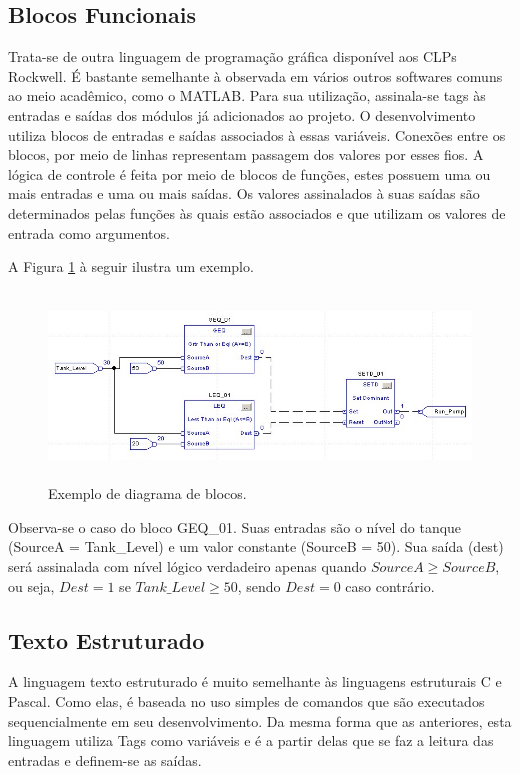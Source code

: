 \subsection{Blocos Funcionais} \label{subsec:blocos}
Trata-se de outra linguagem de programação gráfica disponível aos CLPs Rockwell. É bastante semelhante à observada em vários outros softwares comuns ao meio acadêmico, como o MATLAB. Para sua utilização, assinala-se tags às entradas e saídas dos módulos já adicionados ao projeto. O desenvolvimento utiliza blocos de entradas e saídas associados à essas variáveis. Conexões entre os blocos, por meio de linhas representam passagem dos valores por esses fios. A lógica de controle é feita por meio de blocos de funções, estes possuem uma ou mais entradas e uma ou mais saídas. Os valores assinalados à suas saídas são determinados pelas funções às quais estão associados e que utilizam os valores de entrada como argumentos.

A Figura \ref{fig:blocos} à seguir ilustra um exemplo.

\begin{figure}[H]
	\centering
	\includegraphics[height=5cm,keepaspectratio]{figs/blocos.png}
	\caption{Exemplo de diagrama de blocos.}
	\label{fig:blocos}
\end{figure}

Observa-se o caso do bloco GEQ\_01. Suas entradas são o nível do tanque (SourceA = Tank\_Level) e um valor constante (SourceB = 50). Sua saída (dest) será assinalada com nível lógico verdadeiro apenas quando $SourceA \geq SourceB$, ou seja, $Dest=1$ se $Tank\_Level \geq 50$, sendo $Dest = 0$ caso contrário.

\subsection{Texto Estruturado} \label{secTexEst} 
A linguagem texto estruturado é muito semelhante às linguagens estruturais C e Pascal. Como elas, é baseada no uso simples de comandos que são executados sequencialmente em seu desenvolvimento. Da mesma forma que as anteriores, esta linguagem utiliza Tags como variáveis e é a partir delas que se faz a leitura das entradas e definem-se as saídas. 

